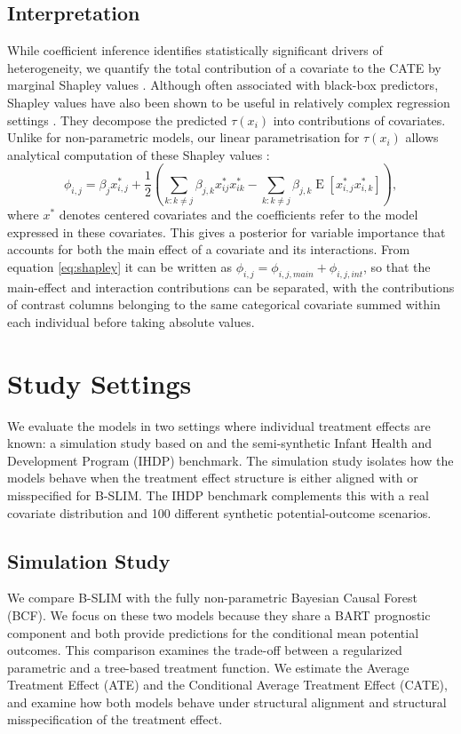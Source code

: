 \documentclass[12pt]{article}
\begin{document}
\subsection{Interpretation}
\label{subsec:shapley}
While coefficient inference identifies statistically significant drivers of heterogeneity, we quantify the total contribution of a covariate to the CATE by marginal Shapley values \citep{aas2021explaining}. Although often associated with black-box predictors, Shapley values have also been shown to be useful in relatively complex regression settings \citep{van2024linked}. They decompose the predicted $\tau(x_i)$ into contributions of covariates. Unlike for non-parametric models, our linear parametrisation for $\tau(x_i)$ allows analytical computation of these Shapley values \citep{van2024linked}:
\begin{equation}
\label{eq:shapley}
    \phi_{i,j} = \beta_j x^*_{i,j} + \frac{1}{2} \left( \sum_{k:k \neq j} \beta_{j,k} x^*_{ij} x^*_{ik} - \sum_{k:k \neq j} \beta_{j,k} \operatorname{E}[x^*_{i,j}x^*_{i,k}] \right),
\end{equation}
where $x^*$ denotes centered covariates and the coefficients refer to the model expressed in these covariates. This gives a posterior for variable importance that accounts for both the main effect of a covariate and its interactions. From equation \eqref{eq:shapley} it can be written as $\phi_{i,j} = \phi_{i,j,main} + \phi_{i,j,int}$, so that the main-effect and interaction contributions can be separated, with the contributions of contrast columns belonging to the same categorical covariate summed within each individual before taking absolute values.

\section{Study Settings}
\label{sec:study_settings}
We evaluate the models in two settings where individual treatment effects are known: a simulation study based on \cite{hahn2020bayesian} and the semi-synthetic Infant Health and Development Program (IHDP) benchmark. The simulation study isolates how the models behave when the treatment effect structure is either aligned with or misspecified for B-SLIM. The IHDP benchmark complements this with a real covariate distribution and 100 different synthetic potential-outcome scenarios.

\subsection{Simulation Study}
\label{sec:simulation}
We compare B-SLIM with the fully non-parametric Bayesian Causal Forest (BCF). We focus on these two models because they share a BART prognostic component and both provide predictions for the conditional mean potential outcomes. This comparison examines the trade-off between a regularized parametric and a tree-based treatment function. We estimate the Average Treatment Effect (ATE) and the Conditional Average Treatment Effect (CATE), and examine how both models behave under structural alignment and structural misspecification of the treatment effect.
\end{document}
